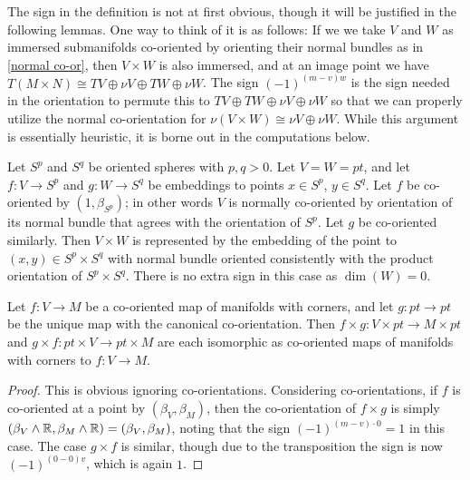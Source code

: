 \begin{remark}
	The sign in the definition is not at first obvious, though it will be justified in the following lemmas.
	One way to think of it is as follows: If we we take $V$ and $W$ as immersed submanifolds co-oriented by orienting their normal bundles as in \cref{normal co-or}, then $V \times W$ is also immersed, and at an image point we have $T(M \times N) \cong TV \oplus \nu V \oplus TW \oplus \nu W$.
	The sign $(-1)^{(m-v)w}$ is the sign needed in the orientation to permute this to $TV \oplus TW \oplus \nu V \oplus \nu W$ so that we can properly utilize the normal co-orientation for $\nu(V \times W) \cong \nu V \oplus \nu W$.
	While this argument is essentially heuristic, it is borne out in the computations below.
\end{remark}

\begin{example}\label{E: sphere product}
	Let $S^p$ and $S^q$ be oriented spheres with $p,q>0$.
	Let $V = W = pt$, and let $f \colon V \to S^p$ and $g \colon W \to S^q$ be embeddings to points $x \in S^p$, $y \in S^q$.
	Let $f$ be co-oriented by $(1,\beta_{S^p})$; in other words $V$ is normally co-oriented by orientation of its normal bundle that agrees with the orientation of $S^p$.
	Let $g$ be co-oriented similarly.
	Then $V \times W$ is represented by the embedding of the point to $(x,y) \in S^p \times S^q$ with normal bundle oriented consistently with the product orientation of $S^p \times S^q$.
	There is no extra sign in this case as $\dim(W) = 0$.
\end{example}

\begin{proposition}\label{P: co-oriented exterior unit}
	Let $f \colon V \to M$ be a co-oriented map of manifolds with corners, and let $g:pt \to pt$ be the unique map with the canonical co-orientation.
	Then $f \times g \colon V \times pt \to M \times pt$ and $g \times f:pt \times V \to pt \times M$ are each isomorphic as co-oriented maps of manifolds with corners to $f \colon V \to M$.
\end{proposition}

\begin{proof}
	This is obvious ignoring co-orientations.
	Considering co-orientations, if $f$ is co-oriented at a point by $(\beta_V,\beta_M)$, then the co-orientation of $f \times g$ is simply $(\beta_V \wedge \mathbb{R},\beta_M \wedge \mathbb{R}) = (\beta_V,\beta_M)$, noting that
	the sign $(-1)^{(m-v)\cdot 0} = 1$ in this case.
	The case $g \times f$ is similar, though due to the transposition the sign is now $(-1)^{(0-0)v}$, which is again $1$.
\end{proof}

